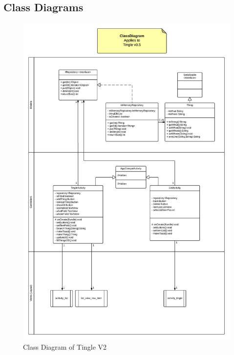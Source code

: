 \documentclass{article}
\begin{document}
\subsection{Class Diagrams}
\begin{figure}[h!]
	\centering
	\includegraphics[scale=0.4]{"TingleApp_ClassDiagram V05"}
	\caption{Class Diagram of Tingle V2}
	\label{fig:TingleApp_ClassDiagramV02}
\end{figure}
\end{document}
